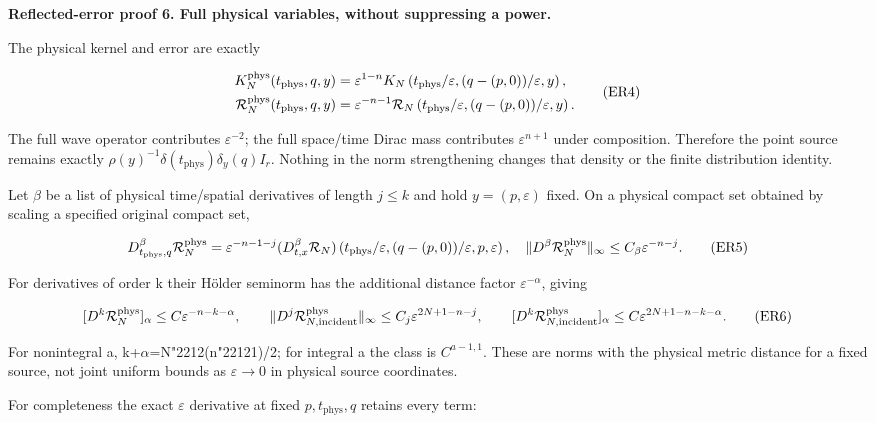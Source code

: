 \documentclass[
  11pt,
]{article}
\begin{document}
\textbf{Reflected-error proof 6. Full physical variables, without
suppressing a power.}

The physical kernel and error are exactly

\[
 \begin{split}
 K_N^{\rm phys}(t_{\rm phys},q,y)
 &=\varepsilon^{1-n}K_N\left(t_{\rm phys}/\varepsilon,
                         (q-(p,0))/\varepsilon,y\right),\\
 \mathcal R_N^{\rm phys}(t_{\rm phys},q,y)
 &=\varepsilon^{-n-1}\mathcal R_N\left(t_{\rm phys}/\varepsilon,
                         (q-(p,0))/\varepsilon,y\right).
 \end{split}
 \tag{ER4}
\]

The full wave operator contributes \ensuremath{\varepsilon^{-2}}; the full space/time
Dirac mass contributes \ensuremath{\varepsilon^{n+1}} under composition. Therefore the
point source remains exactly \ensuremath{\rho(y)^{-1}\delta(t_{\mathrm{phys}})\delta_y(q)I_r}.
Nothing in the norm strengthening changes that density or the finite
distribution identity.

Let \ensuremath{\beta} be a list of physical time/spatial derivatives of length
\(j\leq k\) and hold \(y=(p,\varepsilon )\) fixed. On a physical compact
set obtained by scaling a specified original compact set,

\[
 D_{t_{\rm phys},q}^{\beta}\mathcal R_N^{\rm phys}
 =\varepsilon^{-n-1-j}(D_{t,x}^{\beta}\mathcal R_N)
            \left(t_{\rm phys}/\varepsilon,(q-(p,0))/\varepsilon,p,\varepsilon\right),
 \quad
 \|D^\beta\mathcal R_N^{\rm phys}\|_\infty
                         \leq C_\beta\varepsilon^{-n-j}.
 \tag{ER5}
\]

For derivatives of order k their Hölder seminorm has the additional
distance factor \ensuremath{\varepsilon^{-\alpha}}, giving

\[
 [D^k\mathcal R_N^{\rm phys}]_\alpha
 \leq C\varepsilon^{-n-k-\alpha},\qquad
 \|D^j\mathcal R_{N,\rm incident}^{\rm phys}\|_\infty
       \leq C_j\varepsilon^{2N+1-n-j},\qquad
 [D^k\mathcal R_{N,\rm incident}^{\rm phys}]_\alpha
       \leq C\varepsilon^{2N+1-n-k-\alpha}.
 \tag{ER6}
\]

For nonintegral a, k+\ensuremath{\alpha}=N{\ReaderSymbols\char"2212}(n{\ReaderSymbols\char"2212}1)/2; for integral a the class is
\(C^{a-1,1}\). These are norms with the physical metric distance for a
fixed source, not joint uniform bounds as \ensuremath{\varepsilon}\ensuremath{\to}0 in physical source
coordinates.

For completeness the exact \ensuremath{\varepsilon} derivative at fixed \ensuremath{p,t_{\mathrm{phys}},q} retains
every term:
\end{document}
